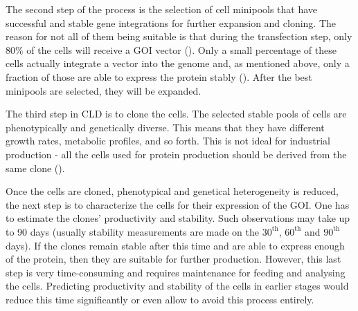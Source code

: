 The second step of the process is the selection of cell minipools that have successful and stable gene integrations for further expansion and cloning. The reason for not all of them being suitable is that during the transfection step, only 80\% of the cells will receive a GOI vector (\cite{Castan_2018}). Only a small percentage of these cells actually integrate a vector into the genome and, as mentioned above, only a fraction of those are able to express the protein stably (\cite{Shin_2020}). After the best minipools are selected, they will be expanded.

The third step in CLD is to clone the cells. The selected stable pools of cells are phenotypically and genetically diverse. This means that they have different growth rates, metabolic profiles, and so forth. This is not ideal for industrial production - all the cells used for protein production should be derived from the same clone (\cite{ema_2020}). 

Once the cells are cloned, phenotypical and genetical heterogeneity is reduced, the next step is to characterize the cells for their expression of the GOI. One has to estimate the clones' productivity and stability. Such observations may take up to 90 days (usually stability measurements are made on the $30^{\text{th}}$, $60^{\text{th}}$ and $90^{\text{th}}$ days). If the clones remain stable after this time and are able to express enough of the protein, then they are suitable for further production. However, this last step is very time-consuming and requires maintenance for feeding and analysing the cells. Predicting productivity and stability of the cells in earlier stages would reduce this time significantly or even allow to avoid this process entirely.